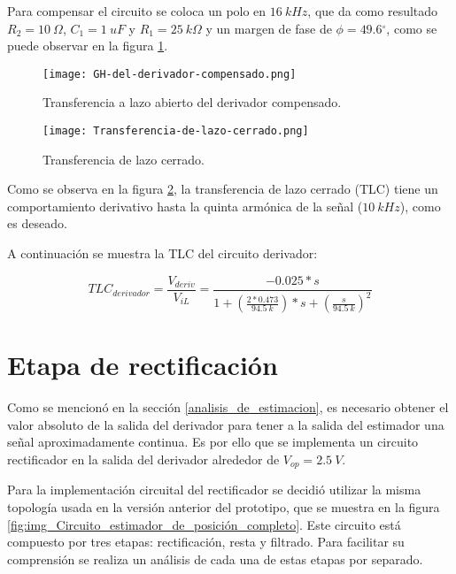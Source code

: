 Para compensar el circuito se coloca un polo en $16 \:kHz$, que da como resultado $R_2=10\:\Omega$, $C_1=1\:uF$ y $R_1=25\: k\Omega$ y un margen de fase de $\phi =49.6{}^\circ $, como se puede observar en la figura \ref{fig:img_GH del derivador compensado}.

\begin{figure}[H]
	\centering
	\texttt{[image: GH-del-derivador-compensado.png]}
	\caption{Transferencia a lazo abierto del derivador compensado.}
	\label{fig:img_GH del derivador compensado}
\end{figure}

\begin{figure}[H]
	\centering
	\texttt{[image: Transferencia-de-lazo-cerrado.png]}
	\caption{Transferencia de lazo cerrado.}
	\label{fig:img_Transferencia-de-lazo-cerrado}
\end{figure}

Como se observa en la figura \ref{fig:img_Transferencia-de-lazo-cerrado}, la transferencia de lazo cerrado (TLC) tiene un comportamiento derivativo hasta la quinta armónica de la señal ($10 \:kHz$), como es deseado.

A continuación se muestra la TLC del circuito derivador:

\begin{equation} \label{eq_TLC_derivador}
	{TLC}_{derivador}=\frac{V_{deriv}}{V_{iL}}=\frac{-0.025*s}{1+(\frac{2*0.473}{94.5\: k})*s+(\frac{s}{94.5\:k})^2}
\end{equation} 

\section{Etapa de rectificación}

Como se mencionó en la sección \ref{analisis_de_estimacion}, es necesario obtener el valor absoluto de la salida del derivador para tener a la salida del estimador una señal aproximadamente continua. Es por ello que se implementa un circuito rectificador en la salida del derivador alrededor de $V_{op}=2.5\:V$.

Para la implementación circuital del rectificador se decidió utilizar la misma topología usada en la versión anterior del prototipo, que se muestra en la figura \ref{fig:img_Circuito_estimador_de_posición_completo}. Este circuito está compuesto por tres etapas: rectificación, resta y filtrado. Para facilitar su comprensión se realiza un análisis de cada una de estas etapas por separado.

